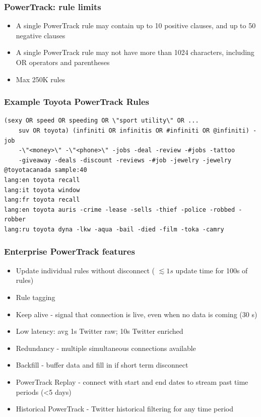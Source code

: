 \documentclass{beamer}
\begin{document}

\begin{frame}\frametitle{PowerTrack: rule limits}
\begin{itemize}
\item A single PowerTrack rule may contain up to 10 positive clauses, and up to 50 negative clauses
\item A single PowerTrack rule may not have more than 1024 characters, including OR operators and parentheses
\item Max 250K rules
\end{itemize}
\end{frame}


\begin{frame}[fragile]\frametitle{Example Toyota PowerTrack Rules}
\begin{verbatim}
(sexy OR speed OR speeding OR \"sport utility\" OR ...
    suv OR toyota) (infiniti OR infinitis OR #infiniti OR @infiniti) -job 
    -\"<money>\" -\"<phone>\" -jobs -deal -review -#jobs -tattoo
    -giveaway -deals -discount -reviews -#job -jewelry -jewelry
@toyotacanada sample:40
lang:en toyota recall
lang:it toyota window
lang:fr toyota recall
lang:en toyota auris -crime -lease -sells -thief -police -robbed -robber
lang:ru toyota dyna -lkw -aqua -bail -died -film -toka -camry
\end{verbatim}
\end{frame}

\begin{frame}\frametitle{Enterprise PowerTrack features}
\begin{itemize}
\item Update individual rules without disconnect ( $\lesssim1s$ update time for 100s of rules)
\item Rule tagging
\item Keep alive - signal that connection is live, even when no data is coming (30 s)
\item Low latency: avg 1s Twitter raw; 10s Twitter enriched
\item Redundancy - multiple simultaneous connections available
\item Backfill - buffer data and fill in if short term disconnect
\item PowerTrack Replay - connect with start and end dates to stream past time periods (<5 days)
\item Historical PowerTrack - Twitter historical filtering for any time period
\end{itemize}
\end{frame}
\end{document}

